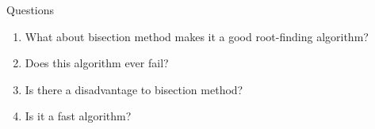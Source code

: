 \documentclass[10pt]{beamer}
\begin{document}

\begin{frame}{Questions}

\begin{enumerate}
    \item What about bisection method makes it a good root-finding algorithm?\\[5mm] 
    \item Does this algorithm ever fail?\\[5mm]
    \item Is there a disadvantage to bisection method?\\[5mm] 
    \item Is it a fast algorithm? 
\end{enumerate}

\end{frame}
\end{document}
